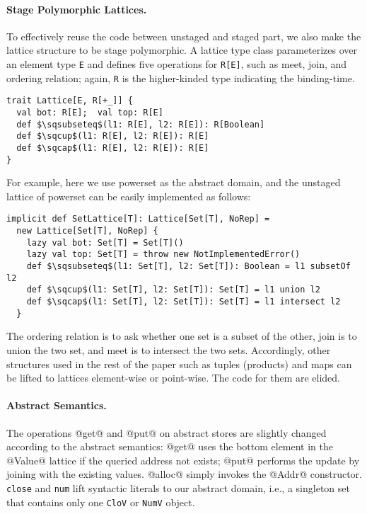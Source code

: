 \paragraph{Stage Polymorphic Lattices.}
To effectively reuse the code between unstaged and staged part, we also make the lattice structure to
be stage polymorphic. A lattice type class parameterizes over an element type \texttt{E} and defines
five operations for \texttt{R[E]}, such as meet, join, and ordering relation; again, \texttt{R} 
is the higher-kinded type indicating the binding-time.
\begin{lstlisting}
trait Lattice[E, R[+_]] {
  val bot: R[E];  val top: R[E]
  def $\sqsubseteq$(l1: R[E], l2: R[E]): R[Boolean]
  def $\sqcup$(l1: R[E], l2: R[E]): R[E]
  def $\sqcap$(l1: R[E], l2: R[E]): R[E]
}
\end{lstlisting}

For example, here we use powerset as the abstract domain, and the unstaged lattice 
of powerset can be easily implemented as follows:

\begin{lstlisting}
implicit def SetLattice[T]: Lattice[Set[T], NoRep] = 
  new Lattice[Set[T], NoRep] {
    lazy val bot: Set[T] = Set[T]()
    lazy val top: Set[T] = throw new NotImplementedError()
    def $\sqsubseteq$(l1: Set[T], l2: Set[T]): Boolean = l1 subsetOf l2
    def $\sqcup$(l1: Set[T], l2: Set[T]): Set[T] = l1 union l2
    def $\sqcap$(l1: Set[T], l2: Set[T]): Set[T] = l1 intersect l2
  }
\end{lstlisting}

The ordering relation is to ask whether one set is a subset of the other, 
join is to union the two set, and meet is to intersect the two sets.
Accordingly, other structures used in the rest of the paper such as tuples 
(products) and maps can be lifted to lattices element-wise or point-wise.
The code for them are elided.

\paragraph{Abstract Semantics.}
The operations @get@ and @put@ on abstract stores are slightly changed according to
the abstract semantics: @get@ uses the bottom element in the @Value@ lattice if the 
queried address not exists; @put@ performs the update by joining with the existing values.
@alloc@ simply invokes the @Addr@ constructor.
\texttt{close} and \texttt{num} lift syntactic literals to our abstract domain, i.e., 
a singleton set that contains only one \texttt{CloV} or \texttt{NumV} object.

